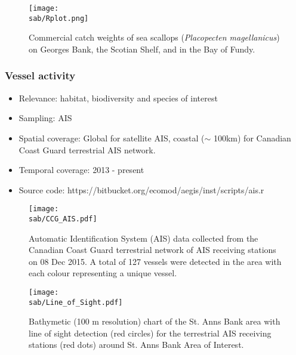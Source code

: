 \documentclass{beamer}
\numberwithin{figure}{section}		%
\numberwithin{table}{section}				%
\newcommand{\D}{.}
\newcommand{\bd}{\string~/bio\D data}   %
\newcommand{\sab}{\bd/mpa/sab}   %
\begin{document}

\begin{frame}[shrink]
\begin{figure}[h]
	\centering
 \texttt{[image: \\sab/Rplot.png]}
	\caption{Commercial catch weights of sea scallops (\textit{Placopecten magellanicus}) on Georges Bank, the Scotian Shelf, and in the Bay of Fundy.}
		\label{fig:Scallop}
\end{figure}
\end{frame}




\begin{frame}[shrink]
\frametitle{Vessel activity}
\begin{itemize}
	\item Relevance:  habitat, biodiversity and species of interest
	\item Sampling:  AIS
	\item Spatial coverage: Global for satellite AIS, coastal ($\sim$ 100km) for Canadian Coast Guard terrestrial AIS network.
	\item Temporal coverage: 2013 - present
	\item Source code: https://bitbucket.org/ecomod/aegis/inst/scripts/ais.r
\end{itemize}	
\end{frame}



\begin{frame}[shrink]

\begin{figure}[h]
  \centering
	\texttt{[image: \\sab/CCG\_AIS.pdf]}
	\caption{Automatic Identification System (AIS) data collected from the Canadian Coast Guard terrestrial network of AIS receiving stations on 08 Dec 2015. A total of 127 vessels were detected in the area with each colour representing a unique vessel.}
    \label{fig:TAIS}
\end{figure}


\end{frame}




\begin{frame}[shrink]

\begin{figure}[h]
	\centering
	\texttt{[image: \\sab/Line\_of\_Sight.pdf]}
	\caption{Bathymetic (100 m resolution) chart of the  St. Anns Bank area with line of sight detection (red circles) for the terrestrial AIS receiving stations (red dots) around St. Anns Bank Area of Interest.}
   \label{fig:LOF}
\end{figure}

\end{frame}
\end{document}

